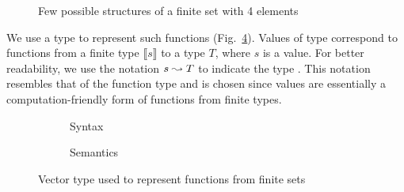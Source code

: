 \begin{figure}
  
\caption{Few possible structures of a finite set with 4 elements}
\label{fig:sort-shape}
\end{figure}

We use a type  to represent such functions
(Fig.~\ref{code:vec}).
Values of type  correspond to functions from a finite
type $⟦s⟧$ to a type $T$, where $s$ is a  value.
For better readability, we use the notation $s \mathrel{\leadsto} T$ to indicate
the type .
%
This notation resembles that of the function type and is chosen since
 values are essentially a computation-friendly form of
functions from finite types.
%

\begin{figure}
\begin{subfigure}{0.5\textwidth}
  
  \caption{Syntax}
  \label{code:vec-syntax}
\end{subfigure}
\begin{subfigure}{0.5\textwidth}
  
  \caption{Semantics}
  \label{code:vec-sem}
\end{subfigure}
\caption{Vector type used to represent functions from finite sets}
\label{code:vec}
\end{figure}

